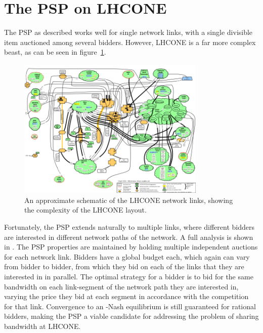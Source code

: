 \section{The PSP on LHCONE}

The PSP as described works well for single network links, with a single divisible item auctioned among several bidders. However, LHCONE is a far more complex beast, as can be seen in figure~\ref{fig:lhcone}.

\begin{figure}[h]
 \centering
   \includegraphics[width=0.8\textwidth]{LHCONE}
       \caption{An approximate schematic of the LHCONE network links, showing the complexity of the LHCONE layout.}
 \label{fig:lhcone}
\end{figure}

Fortunately, the PSP extends naturally to multiple links, where different bidders are interested in different network paths of the network. A full analysis is shown in \cite{PSP-multi}. The PSP properties are maintained by holding multiple independent auctions for each network link. Bidders have a global budget each, which again can vary from bidder to bidder, from which they bid on each of the links that they are interested in in parallel. The optimal strategy for a bidder is to bid for the same bandwidth on each link-segment of the network path they are interested in, varying the price they bid at each segment in accordance with the competition for that link. Convergence to an \textepsilon-Nash equilibrium is still guaranteed for rational bidders, making the PSP a viable candidate for addressing the problem of sharing bandwidth at LHCONE.